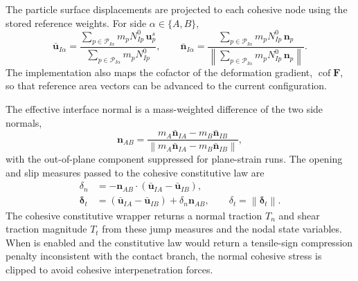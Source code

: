 The particle surface displacements are projected to each cohesive node using the stored reference weights.  For side $\alpha\in\{A,B\}$,
\begin{equation}
  \bar{\mathbf{u}}_{I\alpha}
  = \frac{\sum_{p\in \mathcal{P}_{I\alpha}} m_p N^0_{Ip}\,\mathbf{u}^s_p}
         {\sum_{p\in \mathcal{P}_{I\alpha}} m_p N^0_{Ip}},
  \qquad
  \bar{\mathbf{n}}_{I\alpha}
  = \frac{\sum_{p\in \mathcal{P}_{I\alpha}} m_p N^0_{Ip}\,\mathbf{n}_p}
         {\left\lVert\sum_{p\in \mathcal{P}_{I\alpha}} m_p N^0_{Ip}\,\mathbf{n}_p\right\rVert}.
  \label{eq:cz-grid-projection}
\end{equation}
The implementation also maps the cofactor of the deformation gradient, $\operatorname{cof}\mathbf{F}$, so that reference area vectors can be advanced to the current configuration.

The effective interface normal is a mass-weighted difference of the two side normals,
\begin{equation}
  \mathbf{n}_{AB}
  = \frac{m_A\bar{\mathbf{n}}_{IA}-m_B\bar{\mathbf{n}}_{IB}}
         {\left\lVert m_A\bar{\mathbf{n}}_{IA}-m_B\bar{\mathbf{n}}_{IB}\right\rVert},
  \label{eq:cz-effective-normal}
\end{equation}
with the out-of-plane component suppressed for plane-strain runs.  The opening and slip measures passed to the cohesive constitutive law are
\begin{align}
  \delta_n &= -\mathbf{n}_{AB}\cdot\left(\bar{\mathbf{u}}_{IA}-\bar{\mathbf{u}}_{IB}\right),\\
  \boldsymbol{\delta}_t
    &= \left(\bar{\mathbf{u}}_{IA}-\bar{\mathbf{u}}_{IB}\right)+\delta_n\mathbf{n}_{AB},
  \qquad
  \delta_t=\left\lVert\boldsymbol{\delta}_t\right\rVert.
  \label{eq:cz-jump}
\end{align}
The cohesive constitutive wrapper returns a normal traction $T_n$ and shear traction magnitude $T_t$ from these jump measures and the nodal state variables.  When  is enabled and the constitutive law would return a tensile-sign compression penalty inconsistent with the contact branch, the normal cohesive stress is clipped to avoid cohesive interpenetration forces.

